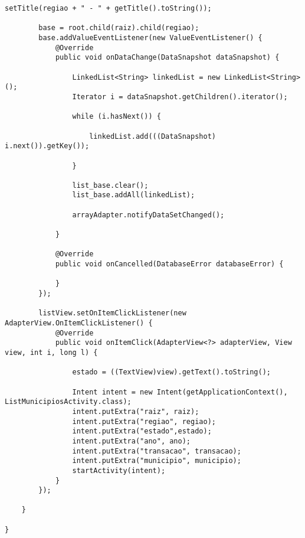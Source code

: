 \documentclass[12pt,a4paper]{article}
\begin{document}
\begin{lstlisting}[caption=./mobile/src/main/java/app/transparenciaeducativa/ListEstadosActivity.java]
        setTitle(regiao + " - " + getTitle().toString());

        base = root.child(raiz).child(regiao);
        base.addValueEventListener(new ValueEventListener() {
            @Override
            public void onDataChange(DataSnapshot dataSnapshot) {

                LinkedList<String> linkedList = new LinkedList<String>();
                Iterator i = dataSnapshot.getChildren().iterator();

                while (i.hasNext()) {

                    linkedList.add(((DataSnapshot) i.next()).getKey());

                }

                list_base.clear();
                list_base.addAll(linkedList);

                arrayAdapter.notifyDataSetChanged();

            }

            @Override
            public void onCancelled(DatabaseError databaseError) {

            }
        });

        listView.setOnItemClickListener(new AdapterView.OnItemClickListener() {
            @Override
            public void onItemClick(AdapterView<?> adapterView, View view, int i, long l) {

                estado = ((TextView)view).getText().toString();

                Intent intent = new Intent(getApplicationContext(), ListMunicipiosActivity.class);
                intent.putExtra("raiz", raiz);
                intent.putExtra("regiao", regiao);
                intent.putExtra("estado",estado);
                intent.putExtra("ano", ano);
                intent.putExtra("transacao", transacao);
                intent.putExtra("municipio", municipio);
                startActivity(intent);
            }
        });

    }

}
\end{lstlisting}
\pagebreak
\end{document}

